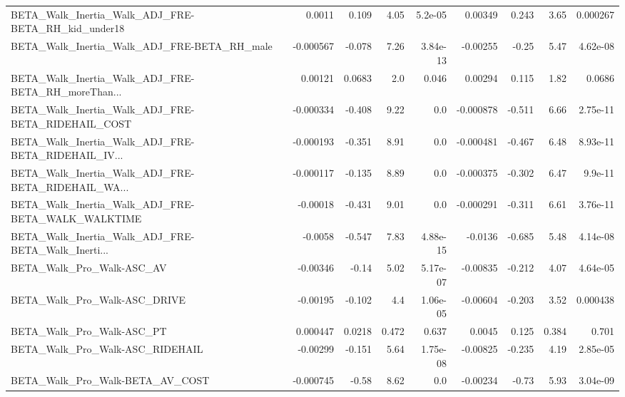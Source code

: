 \begin{tabular}{lrrrrrrrr}
BETA\_Walk\_Inertia\_Walk\_ADJ\_FRE-BETA\_RH\_kid\_under18 &      0.0011 &        0.109 &     4.05 &  5.2e-05 &    0.00349 &       0.243 &         3.65 &      0.000267 \\
BETA\_Walk\_Inertia\_Walk\_ADJ\_FRE-BETA\_RH\_male        &   -0.000567 &       -0.078 &     7.26 & 3.84e-13 &   -0.00255 &       -0.25 &         5.47 &      4.62e-08 \\
BETA\_Walk\_Inertia\_Walk\_ADJ\_FRE-BETA\_RH\_moreThan... &     0.00121 &       0.0683 &      2.0 &    0.046 &    0.00294 &       0.115 &         1.82 &        0.0686 \\
BETA\_Walk\_Inertia\_Walk\_ADJ\_FRE-BETA\_RIDEHAIL\_COST  &   -0.000334 &       -0.408 &     9.22 &      0.0 &  -0.000878 &      -0.511 &         6.66 &      2.75e-11 \\
BETA\_Walk\_Inertia\_Walk\_ADJ\_FRE-BETA\_RIDEHAIL\_IV... &   -0.000193 &       -0.351 &     8.91 &      0.0 &  -0.000481 &      -0.467 &         6.48 &      8.93e-11 \\
BETA\_Walk\_Inertia\_Walk\_ADJ\_FRE-BETA\_RIDEHAIL\_WA... &   -0.000117 &       -0.135 &     8.89 &      0.0 &  -0.000375 &      -0.302 &         6.47 &       9.9e-11 \\
BETA\_Walk\_Inertia\_Walk\_ADJ\_FRE-BETA\_WALK\_WALKTIME  &    -0.00018 &       -0.431 &     9.01 &      0.0 &  -0.000291 &      -0.311 &         6.61 &      3.76e-11 \\
BETA\_Walk\_Inertia\_Walk\_ADJ\_FRE-BETA\_Walk\_Inerti... &     -0.0058 &       -0.547 &     7.83 & 4.88e-15 &    -0.0136 &      -0.685 &         5.48 &      4.14e-08 \\
BETA\_Walk\_Pro\_Walk-ASC\_AV                          &    -0.00346 &        -0.14 &     5.02 & 5.17e-07 &   -0.00835 &      -0.212 &         4.07 &      4.64e-05 \\
BETA\_Walk\_Pro\_Walk-ASC\_DRIVE                       &    -0.00195 &       -0.102 &      4.4 & 1.06e-05 &   -0.00604 &      -0.203 &         3.52 &      0.000438 \\
BETA\_Walk\_Pro\_Walk-ASC\_PT                          &    0.000447 &       0.0218 &    0.472 &    0.637 &     0.0045 &       0.125 &        0.384 &         0.701 \\
BETA\_Walk\_Pro\_Walk-ASC\_RIDEHAIL                    &    -0.00299 &       -0.151 &     5.64 & 1.75e-08 &   -0.00825 &      -0.235 &         4.19 &      2.85e-05 \\
BETA\_Walk\_Pro\_Walk-BETA\_AV\_COST                    &   -0.000745 &        -0.58 &     8.62 &      0.0 &   -0.00234 &       -0.73 &         5.93 &      3.04e-09 \\

\end{tabular}
